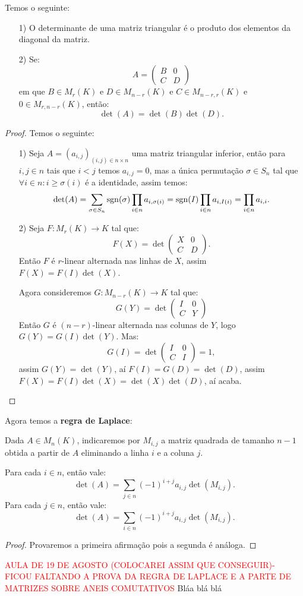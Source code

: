 \documentclass[11pt,twoside,a4paper]{book}
\begin{document}
\begin{proposicao}
Temos o seguinte:
\begin{itemize}
\item[1)] O determinante de uma matriz triangular é o produto dos elementos da diagonal da matriz.
\item[2)] Se:
\[
A=\begin{pmatrix}
B&0\\C&D
\end{pmatrix}
\]
em que $B\in M_r(K)$ e $D\in M_{n-r}(K)$ e $C\in M_{n-r,r}(K)$ e $0\in M_{r,n-r}(K)$, então:
\[
\det(A)=\det(B)\det(D).
\]
\end{itemize}
\end{proposicao}
\begin{proof}
Temos o seguinte:
\begin{itemize}
\item[1)] Seja $A=(a_{i,j})_{(i,j)\in n\times n}$ uma matriz triangular inferior, então para $i,j\in n$ tais que $i<j$ temos $a_{i,j}=0$, mas a única permutação $\sigma\in S_n$ tal que $\forall i\in n:i\geq\sigma(i)$ é a identidade, assim temos:
\[
\det(A)=\sum_{\sigma\in S_n}{\rm sgn}(\sigma)\prod_{i\in n}a_{i,\sigma(i)}={\rm sgn}(I)\prod_{i\in n}a_{i,I(i)}=\prod_{i\in n}a_{i,i}.
\]
\item[2)] Seja $F:M_r(K)\rightarrow K$ tal que:
\[
F(X)=\det\begin{pmatrix}
X&0\\C&D
\end{pmatrix}.
\]
Então $F$ é $r$-linear alternada nas linhas de $X$, assim $F(X)=F(I)\det(X)$.

\medskip
\noindent
Agora consideremos $G:M_{n-r}(K)\rightarrow K$ tal que:
\[
G(Y)=\det\begin{pmatrix}
I&0\\C&Y
\end{pmatrix}
\]
Então $G$ é $(n-r)$-linear alternada nas colunas de $Y$, logo $G(Y)=G(I)\det(Y)$. Mas:
\[
G(I)=\det\begin{pmatrix}
I&0\\C&I
\end{pmatrix}=1,
\]
assim $G(Y)=\det(Y)$, aí $F(I)=G(D)=\det(D)$, assim $F(X)=F(I)\det(X)=\det(X)\det(D)$, aí acaba.
\end{itemize}
\end{proof}

\noindent
Agora temos a \textbf{regra de Laplace}:

\begin{teorema}
Dada $A\in M_n(K)$, indicaremos por $M_{i,j}$ a matriz quadrada de tamanho $n-1$ obtida a partir de $A$ eliminando a linha $i$ e a coluna $j$.

\smallskip
\noindent
Para cada $i\in n$, então vale:
\[
\det(A)=\sum_{j\in n}(-1)^{i+j}a_{i,j}\det(M_{i,j}).
\]
Para cada $j\in n$, então vale:
\[
\det(A)=\sum_{i\in n}(-1)^{i+j}a_{i,j}\det(M_{i,j}).
\]
\end{teorema}
\begin{proof}
Provaremos a primeira afirmação pois a segunda é análoga.
\end{proof}
\textcolor{red}{AULA DE 19 DE AGOSTO (COLOCAREI ASSIM QUE CONSEGUIR)- FICOU
  FALTANDO A PROVA DA REGRA DE LAPLACE E A PARTE DE MATRIZES SOBRE ANEIS COMUTATIVOS}
Bláa blá blá
\end{document}
